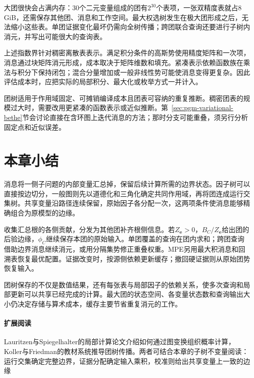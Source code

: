 大团很快会占满内存：$30$个二元变量组成的团有$2^{30}$个表项，一张双精度表就占$8$\,GiB，还需保存其他团、消息和工作空间。最大权选树发生在极大团形成之后，无法缩小这些表。单团证据变化最坏仍需向全树传播；跨团联合查询还要进行子树内消元，并写出可能很大的查询表。

上述指数界针对稠密离散表表示。满足积分条件的高斯势使用精度矩阵和一次项，消息通过块矩阵消元形成，成本取决于矩阵维数和填充。紧凑表示依赖函数族在乘法与积分下保持闭包；混合分量增加或一般非线性势可能使消息变得更复杂。因此评估成本时，应把实际的局部积分、最大化或枚举方式一并计入。

团树适用于作用域固定、可摊销编译成本且团表可容纳的重复推断。稠密团表的规模过大时，需要改用更紧凑的函数表示或近似推断。第~\ref{sec:pgm-variational-bethe}节会讨论直接在含环图上迭代消息的方法；那时分支可能重叠，须另行分析固定点和近似误差。

\section{本章小结}
\label{sec:pgm-junction-tree-summary}

消息将一侧子问题的内部变量汇总掉，保留后续计算所需的边界状态。因子树可以直接按边切分，一般图则先以道德化和三角化确定共同作用域，再将团连成运行交集树。共享变量沿路径连续保留，原始因子各分配一次，这两项条件使消息能够精确组合为原模型的边缘。

收集汇总根的各侧贡献，分发为其他团补齐根侧信息。若$Z_{\bm e}>0$，$B_C/Z_{\bm e}$给出团的后验边缘，$\phi_C$继续保存本团的原始输入。单团覆盖的查询在团内求和；跨团查询借助边界消息继续消元，或用分隔集势修正重叠权重。MPE另用最大积消息和回溯表恢复最优配置。证据改变时，按源侧依赖更新缓存；撤回硬证据则从原始团势恢复输入。

团树保存的不仅是数值结果，还有每张表与局部因子的依赖关系，使多次查询和局部更新可以共享已经完成的计算。最大团的状态空间、各变量状态数和查询输出大小仍决定存储与算术成本，缓存主要节省重复消元的工作。

\paragraph{扩展阅读}
Lauritzen与Spiegelhalter的局部计算论文介绍如何通过图变换组织概率计算，Koller与Friedman的教材系统推导团树传播。两者可结合本章的子树不变量阅读：运行交集确定完整边界，证据分配确定输入乘积，校准则给出共享变量上一致的边缘
